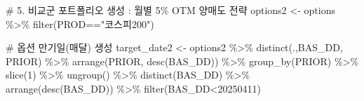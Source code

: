 \documentclass[
  a4paper,
  DIV=11,
  numbers=noendperiod]{scrreprt}
\newenvironment{Shaded}{\begin{snugshade}}{\end{snugshade}}
\newcommand{\CommentTok}[1]{\textcolor[rgb]{0.37,0.37,0.37}{#1}}
\newcommand{\DecValTok}[1]{\textcolor[rgb]{0.68,0.00,0.00}{#1}}
\newcommand{\FunctionTok}[1]{\textcolor[rgb]{0.28,0.35,0.67}{#1}}
\newcommand{\NormalTok}[1]{\textcolor[rgb]{0.00,0.23,0.31}{#1}}
\newcommand{\OtherTok}[1]{\textcolor[rgb]{0.00,0.23,0.31}{#1}}
\newcommand{\SpecialCharTok}[1]{\textcolor[rgb]{0.37,0.37,0.37}{#1}}
\newcommand{\StringTok}[1]{\textcolor[rgb]{0.13,0.47,0.30}{#1}}
\begin{document}
\begin{Shaded}
\begin{Highlighting}[]
\CommentTok{\# 5. 비교군 포트폴리오 생성 : 월별 5\% OTM 양매도 전략}
\NormalTok{options2 }\OtherTok{\textless{}{-}}\NormalTok{ options }\SpecialCharTok{\%\textgreater{}\%} 
  \FunctionTok{filter}\NormalTok{(PROD}\SpecialCharTok{==}\StringTok{"코스피200"}\NormalTok{)}

\CommentTok{\# 옵션 만기일(매달) 생성}
\NormalTok{target\_date2 }\OtherTok{\textless{}{-}}\NormalTok{ options2 }\SpecialCharTok{\%\textgreater{}\%} 
  \FunctionTok{distinct}\NormalTok{(.,BAS\_DD, PRIOR) }\SpecialCharTok{\%\textgreater{}\%} 
  \FunctionTok{arrange}\NormalTok{(PRIOR, }\FunctionTok{desc}\NormalTok{(BAS\_DD)) }\SpecialCharTok{\%\textgreater{}\%} 
  \FunctionTok{group\_by}\NormalTok{(PRIOR) }\SpecialCharTok{\%\textgreater{}\%} 
  \FunctionTok{slice}\NormalTok{(}\DecValTok{1}\NormalTok{) }\SpecialCharTok{\%\textgreater{}\%} 
  \FunctionTok{ungroup}\NormalTok{() }\SpecialCharTok{\%\textgreater{}\%} 
  \FunctionTok{distinct}\NormalTok{(BAS\_DD) }\SpecialCharTok{\%\textgreater{}\%} 
  \FunctionTok{arrange}\NormalTok{(}\FunctionTok{desc}\NormalTok{(BAS\_DD)) }\SpecialCharTok{\%\textgreater{}\%} 
  \FunctionTok{filter}\NormalTok{(BAS\_DD}\SpecialCharTok{\textless{}}\DecValTok{20250411}\NormalTok{)}


\end{Highlighting}
\end{Shaded}
\end{document}

